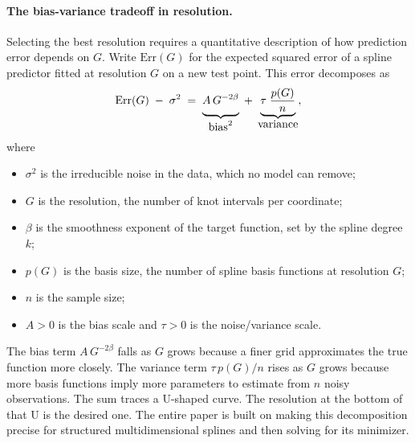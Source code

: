 \documentclass{article}
\newcommand{\Err}{\mathrm{Err}}
\begin{document}
\paragraph{The bias-variance tradeoff in resolution.}
Selecting the best resolution requires a quantitative description of how prediction error depends on $G$. Write $\Err(G)$ for the expected squared error of a spline predictor fitted at resolution $G$ on a new test point. This error decomposes as
\begin{equation}
    \Err(G) \;-\; \sigma^{2}
    \;=\;
    \underbrace{A\, G^{-2\beta}\vphantom{\dfrac{p(G)}{n}}}_{\displaystyle\text{bias}^{2}}
    \;+\;
    \underbrace{\tau\;\dfrac{p(G)}{n}}_{\displaystyle\text{variance}},
\end{equation}
where
\begin{itemize}
    \item $\sigma^{2}$ is the irreducible noise in the data, which no model can remove;
    \item $G$ is the resolution, the number of knot intervals per coordinate;
    \item $\beta$ is the smoothness exponent of the target function, set by the spline degree $k$;
    \item $p(G)$ is the basis size, the number of spline basis functions at resolution $G$;
    \item $n$ is the sample size;
    \item $A > 0$ is the bias scale and $\tau > 0$ is the noise/variance scale.
\end{itemize}
The bias term $A\,G^{-2\beta}$ falls as $G$ grows because a finer grid approximates the true function more closely. The variance term $\tau\,p(G)/n$ rises as $G$ grows because more basis functions imply more parameters to estimate from $n$ noisy observations. The sum traces a U-shaped curve. The resolution at the bottom of that U is the desired one. The entire paper is built on making this decomposition precise for structured multidimensional splines and then solving for its minimizer.
\end{document}
